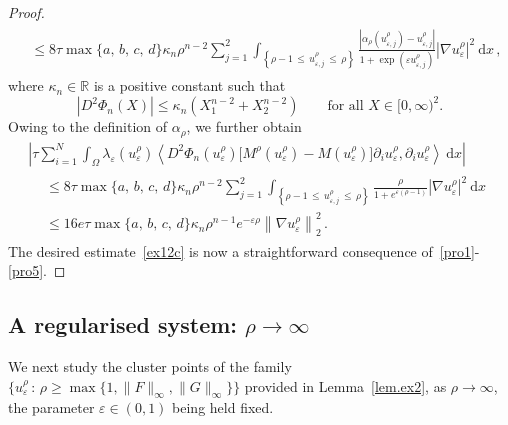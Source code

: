 \documentclass[AHL,Unicode,longabstracts,published]{cedram}
\newcommand{\bbR}{\mathbb{R}}
\newcommand{\rmd}{\mathrm{d}}
\begin{document}
\begin{proof}
\begin{multline*}
\begin{aligned}
& \leq 8\tau \max\{a,\,b,\,c,\,d\}\kappa_n \rho^{n-2} \sum_{j=1}^2 \int_{\left\{\rho-1\,\leq\, u_{\varepsilon,j}^\rho\,\leq\,\rho\right\}} \frac{\left|\alpha_\rho\left(u_{\varepsilon,j}^\rho\right) - u_{\varepsilon,j}^\rho\right|}{1+\exp\left(\varepsilon u_{\varepsilon,j}^\rho\right)} \left|\nabla u_\varepsilon^\rho\right|^2 \ \rmd x\,,
\end{aligned}
\end{multline*}
where $\kappa_n\in\bbR$ is a positive constant such that
\begin{equation*}
\left|D^2\Phi_n(X)\right|\leq \kappa_n\left(X_1^{n-2}+X_2^{n-2}\right)\qquad\text{for all }X\in[0,\infty)^2.
\end{equation*}
Owing to the definition of $\alpha_\rho$, we further obtain
\begin{multline}\label{pro5}
\left| \tau \sum_{i=1}^N\int_\Omega \lambda_\varepsilon(u_\varepsilon^\rho) \left\langle D^2\Phi_n(u_\varepsilon^\rho) \big[M^\rho(u_\varepsilon^\rho) - M(u_\varepsilon^\rho)\big] \partial_i u_{\varepsilon}^\rho, \partial _i u_\varepsilon^\rho\right\rangle\ \rmd x\right| \\[1ex] 
\begin{aligned}
&\leq 8 \tau \max\{a,\,b,\,c,\,d\}\kappa_n \rho^{n-2} \sum_{j=1}^2 \int_{\left\{\rho-1\,\leq\,u_{\varepsilon,j}^\rho\,\leq\,\rho\right\}}\frac{\rho}{1+e^{\varepsilon(\rho-1)}} |\nabla u_\varepsilon^\rho|^2\ \rmd x\\[1ex]
&\leq 16e \tau \max\{a,\,b,\,c,\,d\}\kappa_n \rho^{n-1} e^{-\varepsilon\rho} \left\|\nabla u_\varepsilon^\rho\right\|_2^2\,.
\end{aligned}
\end{multline}
The desired estimate~\eqref{ex12c} is now a straightforward consequence of~\eqref{pro1}-\eqref{pro5}.
\end{proof}



\subsection{A regularised system: \texorpdfstring{$\rho\to\infty$}{rho to infty}}\label{sec2.3}



We next study the cluster points of the family~${\{u_{\varepsilon}^\rho\,:\, \rho\geq \max\{1,\|F\|_\infty,\|G\|_\infty\}\}}$ provided in Lemma~\ref{lem.ex2}, as $\rho\to\infty$, the parameter $\varepsilon\in (0,1)$ being held fixed.
\end{document}
